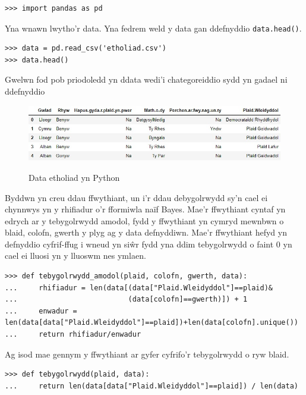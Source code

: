 \begin{verbatim}
>>> import pandas as pd
\end{verbatim}

Yna wnawn lwytho'r data. Yna fedrem weld y data gan ddefnyddio \texttt{data.head()}.

\begin{verbatim}
>>> data = pd.read_csv('etholiad.csv')
>>> data.head()
\end{verbatim}

Gwelwn fod pob priodoledd yn ddata wedi'i chategoreiddio sydd yn gadael ni ddefnyddio 

\begin{figure}[H]
\begin{center}
\includegraphics[width=0.8\linewidth]{../img/data_dosbarthiad_python.jpg}
\label{fig:data_dosbarthiad_python}
\caption{Data etholiad yn Python}
\end{center}
\end{figure}

Byddwn yn creu ddau ffwythiant, un i'r ddau debygolrwydd sy'n cael ei chynnwys yn y rhifiadur o'r fformiwla na\"{i}f Bayes. Mae'r ffwythiant cyntaf yn edrych ar y tebygolrwydd amodol, fydd y ffwythiant yn cymryd mewnbwn o blaid, colofn, gwerth y plyg ag y data defnyddiwn. Mae'r ffwythiant hefyd yn defnyddio cyfrif-ffug i wneud yn si\^{w}r fydd yna ddim tebygolrwydd o faint $0$ yn cael ei lluosi yn y lluoswm nes ymlaen.

\begin{verbatim}
>>> def tebygolrwydd_amodol(plaid, colofn, gwerth, data):
...     rhifiadur = len(data[(data["Plaid.Wleidyddol"]==plaid)&
...                          (data[colofn]==gwerth)]) + 1
...     enwadur = len(data[data["Plaid.Wleidyddol"]==plaid])+len(data[colofn].unique())
...     return rhifiadur/enwadur
\end{verbatim}

Ag isod mae gennym y ffwythiant ar gyfer cyfrifo'r tebygolrwydd o ryw blaid. 

\begin{verbatim}
>>> def tebygolrwydd(plaid, data):
...     return len(data[data["Plaid.Wleidyddol"]==plaid]) / len(data)
\end{verbatim}

